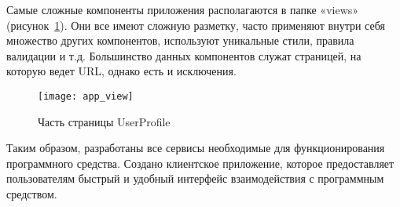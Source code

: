Самые сложные компоненты приложения располагаются в папке «views» (рисунок~\ref{fig:app_view}). Они все имеют сложную разметку, часто применяют внутри себя множество других компонентов, используют уникальные стили, правила валидации и т.д. Большинство данных компонентов служат страницей, на которую ведет URL, однако есть и исключения.

\begin{figure}[h]
    \centering
    \texttt{[image: app\_view]}
    \caption{Часть страницы UserProfile}\label{fig:app_view}
\end{figure}

Таким образом, разработаны все сервисы необходимые для функционирования программного средства. Создано клиентское приложение, которое предоставляет пользователям быстрый и удобный интерфейс взаимодействия с программным средством.
